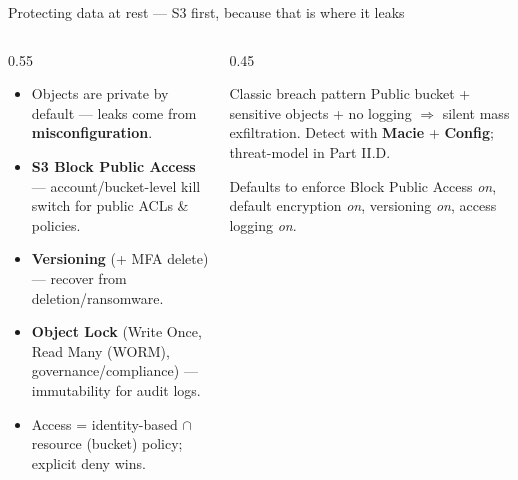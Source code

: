 \documentclass[aspectratio=169,10pt]{beamer}
\newcommand{\svc}[1]{{\color{accent}\textsf{\textbf{#1}}}}      %
\newcommand{\term}[1]{{\color{awsink}\textbf{#1}}}
\begin{document}
\begin{frame}{Protecting data at rest --- S3 first, because that is where it leaks}
  \begin{columns}[T]
    \begin{column}{0.55\textwidth}\small
      \begin{itemize}
        \item Objects are private by default --- leaks come from \term{misconfiguration}.
        \item \term{S3 Block Public Access} --- account/bucket-level kill switch for public ACLs \& policies.
        \item \term{Versioning} (+ MFA delete) --- recover from deletion/ransomware.
        \item \term{Object Lock} (Write Once, Read Many (WORM), governance/compliance) --- immutability for audit logs.
        \item Access = identity-based $\cap$ resource (bucket) policy; explicit deny wins.
      \end{itemize}
    \end{column}
    \begin{column}{0.45\textwidth}
      \begin{alertblock}{\footnotesize Classic breach pattern}
        \footnotesize Public bucket + sensitive objects + no logging $\Rightarrow$ silent mass
        exfiltration. Detect with \svc{Macie} + \svc{Config}; threat-model in Part II.D.
      \end{alertblock}
      \begin{block}{\footnotesize Defaults to enforce}
        \footnotesize Block Public Access \emph{on}, default encryption \emph{on},
        versioning \emph{on}, access logging \emph{on}.
      \end{block}
    \end{column}
  \end{columns}
\end{frame}
\end{document}
